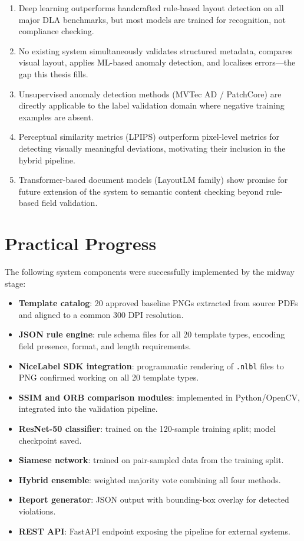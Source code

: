 \begin{enumerate}
  \item Deep learning outperforms handcrafted rule-based layout detection on all major
  DLA benchmarks, but most models are trained for recognition, not compliance checking.

  \item No existing system simultaneously validates structured metadata, compares visual
  layout, applies ML-based anomaly detection, and localises errors—the gap this thesis
  fills.

  \item Unsupervised anomaly detection methods (MVTec AD / PatchCore) are directly
  applicable to the label validation domain where negative training examples are absent.

  \item Perceptual similarity metrics (LPIPS) outperform pixel-level metrics for
  detecting visually meaningful deviations, motivating their inclusion in the hybrid
  pipeline.

  \item Transformer-based document models (LayoutLM family) show promise for future
  extension of the system to semantic content checking beyond rule-based field validation.
\end{enumerate}

\section{Practical Progress}
\label{sec:practical}

The following system components were successfully implemented by the midway stage:

\begin{itemize}
  \item \textbf{Template catalog}: 20 approved baseline PNGs extracted from source
  PDFs and aligned to a common 300 DPI resolution.
  \item \textbf{JSON rule engine}: rule schema files for all 20 template types,
  encoding field presence, format, and length requirements.
  \item \textbf{NiceLabel SDK integration}: programmatic rendering of \texttt{.nlbl}
  files to PNG confirmed working on all 20 template types.
  \item \textbf{SSIM and ORB comparison modules}: implemented in Python/OpenCV,
  integrated into the validation pipeline.
  \item \textbf{ResNet-50 classifier}: trained on the 120-sample training split;
  model checkpoint saved.
  \item \textbf{Siamese network}: trained on pair-sampled data from the training split.
  \item \textbf{Hybrid ensemble}: weighted majority vote combining all four methods.
  \item \textbf{Report generator}: JSON output with bounding-box overlay for detected
  violations.
  \item \textbf{REST API}: FastAPI endpoint exposing the pipeline for external systems.
\end{itemize}


